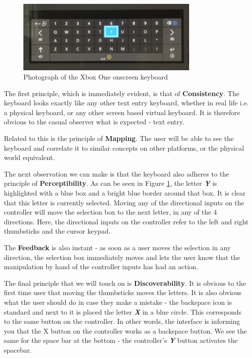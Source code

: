 \documentclass[
	letterpaper, %
]{jdf}
\begin{document}
\begin{figure}[h]
	\centering
	\includegraphics[width=9cm]{jdf-master/Figures/xbox-one-keyboard-photo.jpg}
	\caption{Photograph of the Xbox One onscreen keyboard}
	\label{fig:keyboard-photo}
\end{figure}

The first principle, which is immediately evident, is that of \textbf{Consistency}. The keyboard looks exactly like any other text entry keyboard, whether in real life i.e. a physical keyboard, or any other screen based virtual keyboard. It is therefore obvious to the casual observer what is expected - text entry. 

Related to this is the principle of \textbf{Mapping}. The user will be able to see the keyboard and correlate it to similar concepts on other platforms, or the physical world equivalent.

The next observation we can make is that the keyboard also adheres to the principle of \textbf{Perceptibility}. As can be seen in Figure \ref{fig:keyboard-photo}, the letter \textbf{\textit{Y}} is highlighted with a blue box and a bright blue border around that box. It is clear that this letter is currently selected. Moving any of the directional inputs on the controller will move the selection box to the next letter, in any of the 4 directions. Here, the directional inputs on the controller refer to the left and right thumbsticks and the cursor keypad.

The \textbf{Feedback} is also instant - as soon as a user moves the selection in any direction, the selection box immediately moves and lets the user know that the manipulation by hand of the controller inputs has had an action.

The final principle that we will touch on is \textbf{Discoverability}. It is obvious to the first time user that moving the thumbsticks moves the letters. It is also obvious what the user should do in case they make a mistake - the backspace icon is standard and next to it is placed the letter \textbf{\textit{X}} in a blue circle. This corresponds to the same button on the controller. In other words, the interface is informing you that the X button on the controller works as a backspace button. We see the same for the space bar at the bottom - the controller's \textbf{\textit{Y}} button activates the spacebar.
\end{document}
